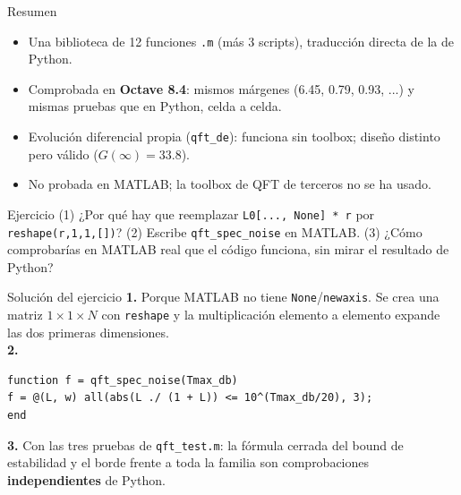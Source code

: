 \documentclass[aspectratio=169,11pt]{beamer}
\begin{document}
\begin{frame}{Resumen}
  \small
  \begin{itemize}
    \item Una biblioteca de 12 funciones \texttt{.m} (más 3 scripts), traducción directa de la de Python.
    \item Comprobada en \textbf{Octave 8.4}: mismos márgenes (6.45, 0.79, 0.93, ...) y mismas pruebas que en Python, celda a celda.
    \item Evolución diferencial propia (\texttt{qft\_de}): funciona sin toolbox; diseño distinto pero válido ($G(\infty)=33.8$).
    \item No probada en MATLAB; la toolbox de QFT de terceros no se ha usado.
  \end{itemize}
  \begin{block}{Ejercicio}
    (1) ¿Por qué hay que reemplazar \texttt{L0[..., None] * r} por \texttt{reshape(r,1,1,[])}? (2) Escribe \texttt{qft\_spec\_noise} en MATLAB. (3) ¿Cómo comprobarías en MATLAB real que el código funciona, sin mirar el resultado de Python?
  \end{block}
\end{frame}

\appendix
\begin{frame}[fragile]{Solución del ejercicio}
  \footnotesize
  \textbf{1.} Porque MATLAB no tiene \texttt{None}/\texttt{newaxis}. Se crea una matriz $1\times1\times N$ con \texttt{reshape} y la multiplicación elemento a elemento expande las dos primeras dimensiones.\\[3pt]
  \textbf{2.}
  \begin{verbatim}
function f = qft_spec_noise(Tmax_db)
f = @(L, w) all(abs(L ./ (1 + L)) <= 10^(Tmax_db/20), 3);
end
  \end{verbatim}
  \textbf{3.} Con las tres pruebas de \texttt{qft\_test.m}: la fórmula cerrada del bound de estabilidad y el borde frente a toda la familia son comprobaciones \textbf{independientes} de Python.
\end{frame}
\end{document}
